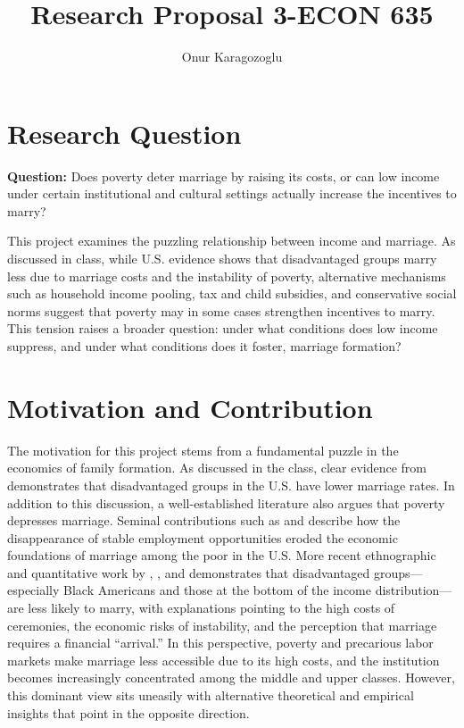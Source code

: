 

\title{Research Proposal 3-ECON 635}
\author{Onur Karagozoglu}
\date{}
\doublespacing



\maketitle

\section*{Research Question}

\textbf{Question:} Does poverty deter marriage by raising its costs, or can low income under certain institutional and cultural settings actually increase the incentives to marry?

This project examines the puzzling relationship between income and marriage. As discussed in class, while U.S. evidence shows that disadvantaged groups marry less due to marriage costs and the instability of poverty, alternative mechanisms such as household income pooling, tax and child subsidies, and conservative social norms suggest that poverty may in some cases strengthen incentives to marry. This tension raises a broader question: under what conditions does low income suppress, and under what conditions does it foster, marriage formation?

\section*{Motivation and Contribution}

The motivation for this project stems from a fundamental puzzle in the economics of family formation. As discussed in the class, clear evidence from \citet{GarciaHeckman2023} demonstrates that disadvantaged groups in the U.S. have lower marriage rates. In addition to this discussion, a well-established literature also argues that poverty depresses marriage. Seminal contributions such as \citet{Wilson1987} and \citet{Murray1994} describe how the disappearance of stable employment opportunities eroded the economic foundations of marriage among the poor in the U.S. More recent ethnographic and quantitative work by \citet{EdinKefalas2005}, \citet{Cherlin2004}, \citet{Autor2019} and \citet{GarciaHeckman2023} demonstrates that disadvantaged groups—especially Black Americans and those at the bottom of the income distribution—are less likely to marry, with explanations pointing to the high costs of ceremonies, the economic risks of instability, and the perception that marriage requires a financial “arrival.” In this perspective, poverty and precarious labor markets make marriage less accessible due to its high costs, and the institution becomes increasingly concentrated among the middle and upper classes. However, this dominant view sits uneasily with alternative theoretical and empirical insights that point in the opposite direction.

